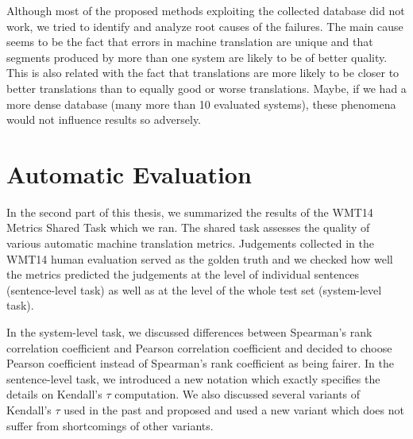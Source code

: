 Although most of the proposed methods exploiting the collected database did not
work, we tried to identify and analyze root causes of the failures. The main
cause seems to be the fact that errors in machine translation are unique and
that segments produced by more than one system are likely to be of better
quality. This is also related with the fact that translations are more likely
to be closer to better translations than to equally good or worse translations.
Maybe, if we had a more dense database (many more than 10 evaluated systems),
these phenomena would not influence results so adversely.

\section{Automatic Evaluation}

In the second part of this thesis, we summarized the results of the WMT14
Metrics Shared Task which we ran. The shared task assesses the quality of
various automatic machine translation metrics. Judgements collected in the
WMT14 human evaluation served as the golden truth and we checked how well the
metrics predicted the judgements at the level of individual sentences
(sentence-level task) as well as at the level of the whole test set
(system-level task).

In the system-level task, we discussed differences between Spearman's rank
correlation coefficient and Pearson correlation coefficient and decided to
choose Pearson coefficient instead of Spearman's rank coefficient as being
fairer. In the sentence-level task, we introduced a new notation which exactly
specifies the details on Kendall's $\tau$ computation. We also discussed
several variants of Kendall's $\tau$ used in the past and proposed and used a
new variant which does not suffer from shortcomings of other variants.

\begin{comment}
Although sentence-level correlations are significantly higher than they were in
the previous years, they are still much lower than system-level ones. Kendall's
$\tau$ reaches at most 0.45 for the best performing metric in the best language
pair. So, there is quite some research work to be done.

On the system level, the best performing metrics on average in directions into
English are \metric{DiscoTK-party-tuned}, \metric{LAYERED} and
\metric{UPC-STOUT}. The best performing metrics in directions out of English
are \metric{NIST}, \metric{CDER} and \metric{AMBER}. On the sentence level, the
best performing metrics in directions into English are
\metric{DiscoTK-party-tuned}, \metric{BEER} and \metric{REDcombSent}. The best
performing metrics in directions out of English are \metric{BEER},
\metric{Meteor} and \metric{AMBER}.
\end{comment}

